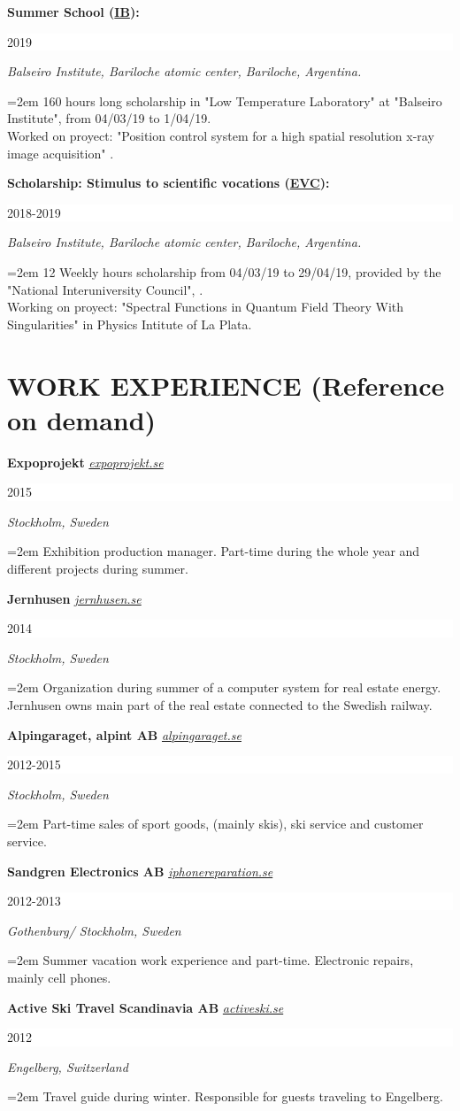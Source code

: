 \documentclass[paper=letter,fontsize=11pt]{scrartcl} %
\newcommand{\sepspace}{\vspace*{1em}}		%
\newcommand{\NewPart}[2]{\section*{\uppercase{#1} \small \normalfont #2}}
\newcommand{\EducationEntry}[4]{
		\noindent \textbf{#1} \hfill      %
		\colorbox{White}{%
			\parbox{6em}{%
			\hfill\color{Black}#2}} \par  %
		\noindent \textit{#3} \par        %
		\noindent\hangindent=2em\hangafter=0 \small #4 %
		\normalsize \par}
\newcommand{\WorkEntry}[5]{
		\noindent \textbf{#1}
        \noindent \small \textit{#2}
        \hfill      %
        \colorbox{White}{%
			\parbox{6em}{%
			\hfill\color{Black}#3}} \par  %
		\noindent \textit{#4} \par        %
		\noindent\hangindent=2em\hangafter=0 \small #5 %
		\normalsize \par}
\begin{document}
\sepspace

\EducationEntry{Summer School ({\href{http://www.ib.edu.ar/component/k2/item/452-becas-de-verano.html}{IB}}):}
{2019}
{Balseiro Institute, Bariloche atomic center, Bariloche, Argentina.}
{160 hours long scholarship in "Low Temperature Laboratory" at "Balseiro Institute", from 04/03/19 to 1/04/19. \\ 
Worked on proyect: "Position control system for a high spatial resolution x-ray image acquisition" .
}

\sepspace

\EducationEntry{Scholarship: Stimulus to scientific vocations ({\href{http://evc.cin.edu.ar/}{EVC}}):}
{2018-2019}
{Balseiro Institute, Bariloche atomic center, Bariloche, Argentina.}
{12 Weekly hours scholarship from 04/03/19 to 29/04/19, provided by the "National Interuniversity Council", . \\ 
Working on proyect: "Spectral Functions in Quantum Field Theory With Singularities" in Physics Intitute of La Plata.
}


\NewPart{Work Experience}{(Reference on demand)}

\WorkEntry{Expoprojekt}{\href{http://expoprojekt.se}{expoprojekt.se}}{2015}{Stockholm, Sweden}{Exhibition production manager. Part-time during the whole year and different projects during summer.}

\sepspace

\WorkEntry{Jernhusen}{\href{http://jernhusen.se}{jernhusen.se}}{2014}{Stockholm, Sweden}{Organization during summer of a computer system for real estate energy. Jernhusen owns main part of the real estate connected to the Swedish railway.}

\sepspace

\WorkEntry{Alpingaraget, alpint AB}{\href{http://alpingaraget.se}{alpingaraget.se}}{2012-2015}{Stockholm, Sweden}{Part-time sales of sport goods, (mainly skis), ski service and customer service.}
\newpage

\WorkEntry{Sandgren Electronics AB}{\href{http://iphonereparation.se}{iphonereparation.se}}{2012-2013}{Gothenburg/ Stockholm, Sweden}{Summer vacation work experience and part-time. Electronic repairs, mainly cell phones.}

\sepspace

\WorkEntry{Active Ski Travel Scandinavia AB}{\href{http://www.activeski.se}{activeski.se}}{2012}{Engelberg, Switzerland}{Travel guide during winter. Responsible for guests traveling to Engelberg.}
\end{document}
